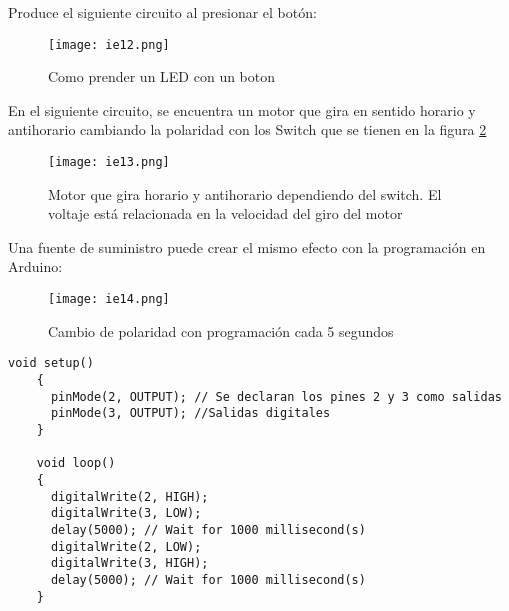 Produce el siguiente circuito al presionar el botón:
  \begin{figure}[h!]
  \centering
    \texttt{[image: ie12.png]}
    \caption{Como prender un LED con un boton}
    \label{ie12}
\end{figure}
En el siguiente circuito, se encuentra un motor que gira en sentido horario y antihorario cambiando la polaridad con los Switch
que se tienen en la figura \ref{ie13}
\begin{figure}[h!]
\centering
  \texttt{[image: ie13.png]}
  \caption{Motor que gira horario y antihorario dependiendo del switch. El voltaje está relacionada en la velocidad del giro del motor}
  \label{ie13}
\end{figure}
Una fuente de suministro puede crear el mismo efecto con la programación en Arduino:
\begin{figure}[h!]
\centering
  \texttt{[image: ie14.png]}
  \caption{Cambio de polaridad con programación cada 5 segundos}
  \label{ie14}
\end{figure}
\begin{lstlisting}[style=cFrameTB, gobble=4]
    void setup()
    {
      pinMode(2, OUTPUT); // Se declaran los pines 2 y 3 como salidas
      pinMode(3, OUTPUT); //Salidas digitales
    }
    
    void loop()
    {
      digitalWrite(2, HIGH);
      digitalWrite(3, LOW);
      delay(5000); // Wait for 1000 millisecond(s)
      digitalWrite(2, LOW);
      digitalWrite(3, HIGH);
      delay(5000); // Wait for 1000 millisecond(s)
    }
\end{lstlisting}

